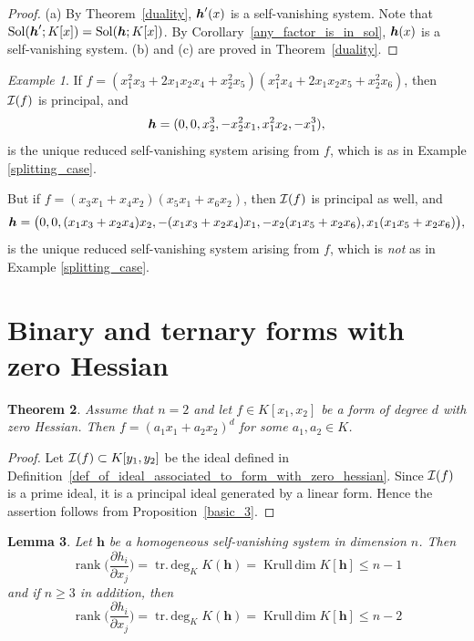 \documentclass[12pt]{article}
\newtheorem{theorem}{Theorem}[section]
\newtheorem{lemma}[theorem]{Lemma}
\theoremstyle{definition}
\theoremstyle{remark}
\newtheorem{example}[theorem]{Example}
\def\cI{{\cal I}}
\def\sol{{\rm Sol}}
\def\boldh{\mbox{\boldmath $h$}}
\def\pa{\partial}
\def\rk{\operatorname{rank}}
\def\krdim{\operatorname{Krull\,dim}}
\def\trdeg{\operatorname{tr.\,deg}}
\def\parder#1#2{\frac{\pa #1}{\pa #2}}
\begin{document}
\begin{proof}
(a) %
By Theorem~\ref{duality}, $\boldh'(x)$ is a self-vanishing system. 
Note that $\sol(\boldh '; K[x])=\sol(\boldh; K[x])$. 
By Corollary~\ref{any_factor_is_in_sol}, 
$\boldh(x)$ is a self-vanishing system. 
(b) and (c) are proved in Theorem~\ref{duality}.
\end{proof} 

\begin{example} \label{no_splitting_case}
If $f = (x_1^2 x_3 + 2 x_1 x_2 x_4 + x_2^2 x_5) 
(x_1^2 x_4 + 2 x_1 x_2 x_5 + x_2^2 x_6)$, then
$\cI(f)$ is principal, and
$$
\boldh = (0, 0, x_2^3, -x_2^2 x_1, x_1^2 x_2, -x_1^3),
$$
is the unique reduced self-vanishing system arising from $f$, 
which is as in Example \ref{splitting_case}. 

But if $f = (x_3 x_1 + x_4 x_2) (x_5 x_1 + x_6 x_2)$, then
$\cI(f)$ is principal as well, and
$$
\boldh =
\big(0, 0, (x_1 x_3 + x_2 x_4) x_2, -(x_1 x_3 + x_2 x_4) x_1, 
-x_2 (x_1 x_5 + x_2 x_6), x_1 (x_1 x_5 + x_2 x_6)\big),
$$
is the unique reduced self-vanishing system arising from $f$, 
which is \emph{not} as in Example \ref{splitting_case}.
%
\end{example}


\section{Binary and ternary forms with zero Hessian}

\begin{theorem}   %
Assume that $n=2$ and let $f \in K[x_1, x_2]$ be a form of degree $d$ 
with zero Hessian. 
Then $f=(a_1x_1+a_2x_2)^d$ for some $a_1, a_2 \in K$.  
\end{theorem}

\begin{proof} Let ${\cal I}(f) \subset K[y_1, y_2]$ be the ideal defined in 
Definition~\ref{def_of_ideal_associated_to_form_with_zero_hessian}.
Since  ${\cal I}(f)$ is a prime ideal, it is a principal ideal 
generated by a linear form. 
Hence the assertion follows from Proposition~\ref{basic_3}. 
\end{proof}

\begin{lemma} \label{rank_of_hessian_matrix_corrected}
Let $\bm{h}$ be a homogeneous self-vanishing system in dimension $n$. Then
$$
\rk \Big(\parder{h_i}{x_j}\Big) = \trdeg_K K(\bm{h}) = \krdim K[\bm{h}] \le n-1
$$
and if $n \ge 3$ in addition, then
$$
\rk \Big(\parder{h_i}{x_j}\Big) = \trdeg_K K(\bm{h}) = \krdim K[\bm{h}] \le n-2
$$
\end{lemma}
\end{document}
